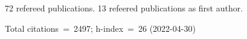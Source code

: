 72 refereed publications. 13 refeered publications as first author.

Total citations~=~2497; h-index~=~26 (2022-04-30)